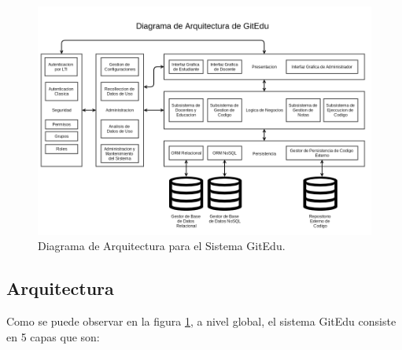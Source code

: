 \pagebreak

\begin{landscape}

	\begin{figure}
	  \begin{center}
	    \includegraphics[width=1.0\textwidth]{Figures/arq_ge.png}
	  \end{center}
	  \caption{Diagrama de Arquitectura para el Sistema GitEdu.}
	  \label{arq_ge}
	\end{figure}

\end{landscape}

\subsection{Arquitectura}
Como se puede observar en la figura \ref{arq_ge}, a nivel global, el sistema GitEdu consiste en 5 capas que son:

